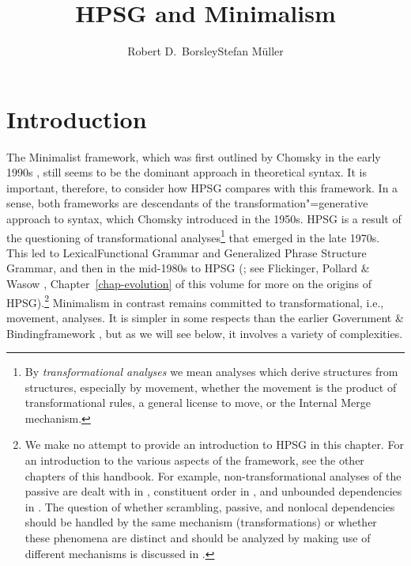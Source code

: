 \documentclass[output=paper,biblatex,babelshorthands,newtxmath,draftmode,colorlinks,citecolor=brown]{langscibook}
\author{Robert D.\ Borsley\affiliation{University of Essex and Bangor University}\lastand Stefan Müller\affiliation{Humboldt-Universität zu Berlin}}
\title{HPSG and Minimalism}
\begin{document}
\maketitle
\label{chap-minimalism}

\section{Introduction}
\label{sec:min-intro}\label{minimalism:sec-intro}


The Minimalist framework, which was first outlined by Chomsky in the early 1990s
\citep{Chomsky93b-u,Chomsky95a-u}, still seems to be the dominant approach in theoretical syntax. It is
important, therefore, to consider how HPSG compares with this framework. In a sense, both frameworks
are descendants of the transformation"=generative approach to syntax, which Chomsky introduced in the
1950s. HPSG is a result of the questioning of transformational analyses\footnote{%
By \emph{transformational analyses} we mean analyses which derive structures from structures, especially
by movement, whether the movement is the product of transformational rules, a general license to
move, or the Internal Merge mechanism.} that emerged in the late
1970s. This led to Lexical\indexlfg Functional Grammar \citep{BK82a} and Generalized Phrase Structure Grammar\indexgpsg \citep*{GKPS85a}, and then in
the mid-1980s to HPSG (\citealt{ps}; see Flickinger, Pollard \& Wasow \citeyear{chapters/evolution},
Chapter~\ref{chap-evolution} of this volume for more on the origins of HPSG).\footnote{
We make no attempt to provide an introduction to HPSG in this chapter. For an introduction to the
various aspects of the framework, see the other chapters of this handbook. For example,
non-transformational analyses of the passive are dealt with in ,
constituent order in , and unbounded dependencies in . The
question of whether scrambling, passive, and nonlocal dependencies should be handled by the same
mechanism (\eg transformations) or whether these phenomena are distinct and should be analyzed by
making use of different mechanisms is discussed in .%
} Minimalism in contrast
remains committed to transformational, i.e., movement, analyses. It is simpler in some respects than
the earlier Government \& Binding\indexgb framework \citep{Chomsky81a}, but as we will see below, it involves a variety of
complexities. 
\end{document}
